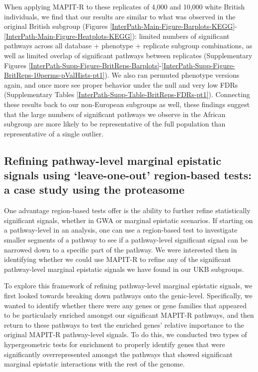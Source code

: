 \documentclass[12pt,a4paper]{article}
\begin{document}
When applying MAPIT-R to these replicates of 4,000 and 10,000 white British individuals, we find that our results are similar to what was observed in the original British subgroup (Figures \ref{InterPath-Main-Figure-Barplots-KEGG}-\ref{InterPath-Main-Figure-Heatplots-KEGG}): limited numbers of significant pathways across all database + phenotype + replicate subgroup combinations, as well as limited overlap of significant pathways between replicates (Supplementary Figures \ref{InterPath-Supp-Figure-BritReps-Barplots}\textcolor{blue}{-}\ref{InterPath-Supp-Figure-BritReps-10perms-pValHists-pt1}). We also ran permuted phenotype versions again, and once more see proper behavior under the null and very low FDRs (Supplementary Tables \ref{InterPath-Supp-Table-BritReps-FDRs-pt1}). Connecting these results back to our non-European subgroups as well, these findings suggest that the large numbers of significant pathways we observe in the African subgroup are more likely to be representative of the full population than representative of a single outlier. 

\subsection{Refining pathway-level marginal epistatic signals using `leave-one-out' region-based tests: a case study using the proteasome}

One advantage region-based tests offer is the ability to further refine statistically significant signals, whether in GWA or marginal epistatic scenarios. If starting on a pathway-level in an analysis, one can use a region-based test to investigate smaller segments of a pathway to see if a pathway-level significant signal can be narrowed down to a specific part of the pathway. We were interested then in identifying whether we could use MAPIT-R to refine any of the significant pathway-level marginal epistatic signals we have found in our UKB subgroups.

To explore this framework of refining pathway-level marginal epistatic signals, we first looked towards breaking down pathways onto the genic-level. Specifically, we wanted to identify whether there were any genes or gene families that appeared to be particularly enriched amongst our significant MAPIT-R pathways, and then return to these pathways to test the enriched genes' relative importance to the original MAPIT-R pathway-level signals. To do this, we conducted two types of hypergeometric tests for enrichment to properly identify genes that were significantly overrepresented amongst the pathways that showed significant marginal epistatic interactions with the rest of the genome. 
\end{document}
